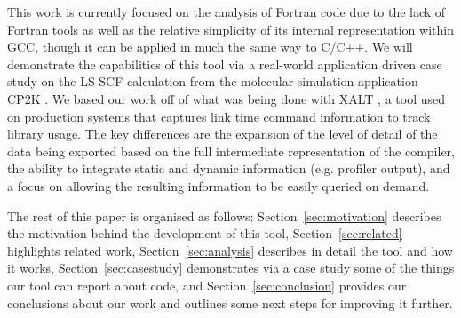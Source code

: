 This work is currently focused on the analysis of Fortran code due to the lack of Fortran tools as well as the relative 
simplicity of its internal representation within \acs{GCC}, though it can be applied in much the same way to C/C++.
We will demonstrate the capabilities of this tool via a real-world application driven case study on the \ac{LS-SCF} 
calculation \cite{vandevondele2012linear} from the molecular simulation application CP2K \cite{hutter2014cp2k}.
We based our work off of what was being done with XALT \cite{7081224}, a tool used on production systems that captures link time command information to track library usage.
The key differences are the 
expansion of the level of detail of the data being exported based on the full intermediate representation of the compiler, the ability to integrate static and dynamic information 
(e.g. profiler output), and a focus on allowing the resulting information to be easily queried on demand.

The rest of this paper is organised as follows: Section~\ref{sec:motivation} describes the motivation behind the 
development of this tool, Section~\ref{sec:related} highlights related work, Section~\ref{sec:analysis} describes in 
detail the tool and how it works, Section~\ref{sec:casestudy} demonstrates via a case study some of the things our 
tool can report about code, and Section~\ref{sec:conclusion} provides our conclusions about our work and outlines 
some next steps for improving it further.
